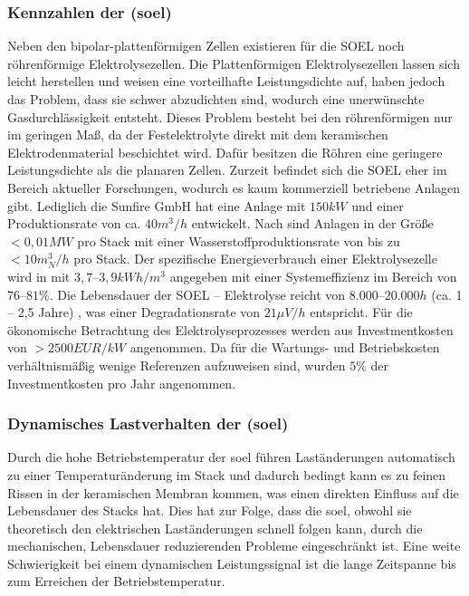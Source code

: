 \documentclass[onecolumn,10pt,titlepage]{article}
\begin{document}
			\subsubsection*{Kennzahlen der (\gls{soel})}
			Neben den bipolar-plattenförmigen Zellen existieren für die SOEL noch röhrenförmige Elektrolysezellen. Die Plattenförmigen Elektrolysezellen lassen sich leicht herstellen und weisen eine vorteilhafte Leistungsdichte auf, haben jedoch das Problem, dass sie schwer abzudichten sind, wodurch eine unerwünschte Gasdurchlässigkeit entsteht. Dieses Problem besteht bei den röhrenförmigen nur im geringen Maß, da der Festelektrolyte direkt mit dem keramischen Elektrodenmaterial beschichtet wird. Dafür besitzen die Röhren eine geringere Leistungsdichte als die planaren Zellen.
			Zurzeit befindet sich die SOEL eher im Bereich aktueller Forschungen, wodurch es kaum kommerziell betriebene Anlagen gibt. Lediglich die Sunfire GmbH hat eine Anlage mit $150kW$ und einer Produktionsrate von ca. $40 m^3/h$ entwickelt.\cite{Sunfire.2017} Nach \cite{Buttler.2018} sind Anlagen in der Größe $<0,01 MW$ pro Stack mit einer Wasserstoffproduktionsrate von bis zu $<10 m^3_N/h$ pro Stack. Der spezifische Energieverbrauch einer Elektrolysezelle wird in \cite{Buttler.2018} mit $3,7–3,9 kWh/m^3$ angegeben mit einer Systemeffizienz im Bereich von $76–81\%$. Die Lebensdauer der SOEL – Elektrolyse reicht von $8.000–20.000 h$ (ca. 1 – 2,5 Jahre) \cite{DeNiangThe.12.2015}, was einer Degradationsrate von  $21 \mu V/h$ entspricht. Für die ökonomische Betrachtung des Elektrolyseprozesses werden aus \cite{Buttler.2018}  Investmentkosten von $>2500 EUR/kW$ angenommen. Da für die Wartungs- und Betriebskosten verhältnismäßig wenige Referenzen aufzuweisen sind, wurden $5 \%$ der Investmentkosten pro Jahr angenommen.

			\subsubsection*{Dynamisches Lastverhalten der (\gls{soel})}
			Durch die hohe Betriebstemperatur der \gls{soel} führen Laständerungen automatisch zu einer Temperaturänderung im Stack und dadurch bedingt kann es zu feinen Rissen in der keramischen Membran kommen, was einen direkten Einfluss auf die Lebensdauer des Stacks hat. Dies hat zur Folge, dass die \gls{soel}, obwohl sie theoretisch den elektrischen Laständerungen schnell folgen kann, durch die mechanischen, Lebensdauer reduzierenden Probleme eingeschränkt ist. Eine weite Schwierigkeit bei einem dynamischen Leistungssignal ist die lange Zeitspanne bis zum Erreichen der Betriebstemperatur.
\end{document}
